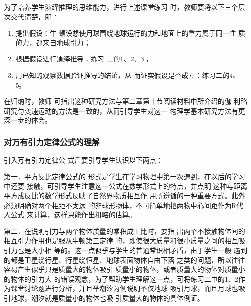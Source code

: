 为了培养学生演绎推理的思维能力，进行上述课堂练习
时，教师要将以下三个层次交代清楚，即：
\begin{enumerate}
    \item 提出假设：牛
顿设想使月球围绕地球运行的力和地面上的重力属于同一性
质的力，都来自地球引力；
\item 根据假设进行演绎推导：练习
二的1、2、3；
\item 用已知的观察数据验证推导的结论，从
而证实假设是否成立：练习二的4、5。
\end{enumerate}

在归纳时，教师
可指出这种研究方法与第二章第十节阅读材料中所介绍的伽
利略研究匀变速运动的方法是一致的，从而引导学生对这一
物理学基本研究方法有更深一步的体会。

\subsubsection{对万有引力定律公式的理解}

引入万有引力定律公
式后要引导学生认识以下两点：

第一，平方反比定律公式的
形式是学生在学习物理中第一次遇到，在以后的学习中还要
接触，可引导学生注意这一公式在数学形式上的特点，并点明
这种与距离平方成反比的数学形式反映了自然界物质相互作
用所遵循的一种重要方式。此外必须明确对两个相距不太远
的非球形物体，不可简单地把两物中心间距作为R代入公式
来计算，这样只能作出粗略的估算。

第二，在说明引力与两个物体质量的乘积成正比时，要指
出两个不接触物体间的相互引力作用也是服从牛顿第三定律
的，即使很大质量和很小质量之间的相互吸引力也是大小相
等的。这一点似乎与学生的普通常识相矛盾，由于学生一般
遇到的都是卫星绕行星、行星绕恒星、地球表面物体自由下落
之类的问题，所以往往容易产生似乎只是质量大的物体吸引
质量小的物体，或者质量大的物体对质量小的物体的引力大
的错误观念，为了帮助学生理解这一点，可将练习二中的1、2作为课堂讨论题进行分析，并且举潮汐为例说明不仅地球
吸引月球，而且月球也吸引地球，潮汐就是质量小的物体也吸
引质量大的物体的具体例证。

